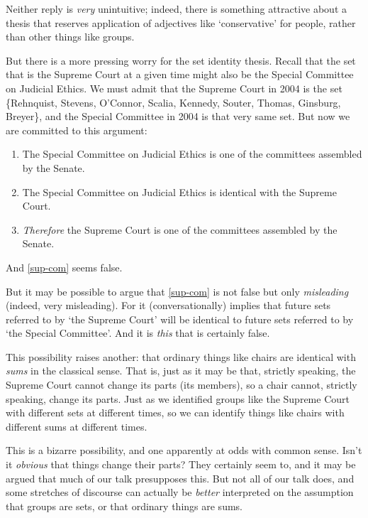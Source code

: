\documentclass[11pt]{article}
\begin{document}
\begin{spacing}{1.5}
Neither reply is {\em very} unintuitive; indeed, there is something
attractive about a thesis that reserves application of adjectives like
`conservative' for people, rather than other things like groups.

But there is a more pressing worry for the set identity thesis.
Recall that the set that is the Supreme Court at a given time might
also be the Special Committee on Judicial Ethics.  We must admit that
the Supreme Court in 2004 is the set \{Rehnquist, Stevens, O'Connor,
Scalia, Kennedy, Souter, Thomas, Ginsburg, Breyer\}, and the Special
Committee in 2004 is that very same set.  But now we are committed to
this argument:

\begin{enumerate}[ref=(\arabic*)]
  \item The Special Committee on Judicial Ethics is one of the
    committees assembled by the Senate.

  \item The Special Committee on Judicial Ethics is identical with the
    Supreme Court.

  \item {\em Therefore} the Supreme Court is one of the committees
    assembled by the
    Senate. \citep[144]{uzquiano2004a} \label{sup-com}
\end{enumerate}

And \ref{sup-com} seems false.

But it may be possible to argue that \ref{sup-com} is not false but
only {\em misleading} (indeed, very misleading).  For it
(conversationally) implies that future sets referred to by `the
Supreme Court' will be identical to future sets referred to by `the
Special Committee'.  And it is {\em this} that is certainly false.

This possibility raises another: that ordinary things like chairs are
identical with {\em sums} in the classical sense.  That is, just as it
may be that, strictly speaking, the Supreme Court cannot change its
parts (its members), so a chair cannot, strictly speaking, change its
parts.  Just as we identified groups like the Supreme Court with
different sets at different times, so we can identify things like
chairs with different sums at different times.

This is a bizarre possibility, and one apparently at odds with common
sense.  Isn't it {\em obvious} that things change their parts?  They
certainly seem to, and it may be argued that much of our talk
presupposes this.  But not all of our talk does, and some stretches of
discourse can actually be {\em better} interpreted on the assumption
that groups are sets, or that ordinary things are sums.


\end{spacing}
\end{document}
